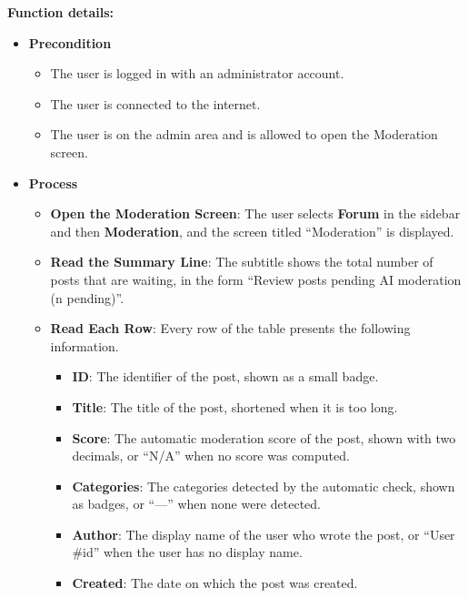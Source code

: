 \textbf{Function details:}
\begin{itemize}[leftmargin=1.6em,topsep=4pt,itemsep=3pt,parsep=0pt,label=$\bullet$]
    \item \textbf{Precondition}
        \begin{itemize}[leftmargin=2.2em,topsep=2pt,itemsep=3pt,parsep=0pt,label=$\circ$]
            \item The user is logged in with an administrator account.
            \item The user is connected to the internet.
            \item The user is on the admin area and is allowed to open the Moderation screen.
        \end{itemize}
    \item \textbf{Process}
        \begin{itemize}[leftmargin=2.2em,topsep=2pt,itemsep=3pt,parsep=0pt,label=$\circ$]
            \item \textbf{Open the Moderation Screen}: The user selects \textbf{Forum} in the sidebar and then \textbf{Moderation}, and the screen titled ``Moderation'' is displayed.
            \item \textbf{Read the Summary Line}: The subtitle shows the total number of posts that are waiting, in the form ``Review posts pending AI moderation (n pending)''.
            \item \textbf{Read Each Row}: Every row of the table presents the following information.
                \begin{itemize}[leftmargin=2.2em,topsep=2pt,itemsep=3pt,parsep=0pt,label=$\blacksquare$]
                    \item \textbf{ID}: The identifier of the post, shown as a small badge.
                    \item \textbf{Title}: The title of the post, shortened when it is too long.
                    \item \textbf{Score}: The automatic moderation score of the post, shown with two decimals, or ``N/A'' when no score was computed.
                    \item \textbf{Categories}: The categories detected by the automatic check, shown as badges, or ``---'' when none were detected.
                    \item \textbf{Author}: The display name of the user who wrote the post, or ``User \#id'' when the user has no display name.
                    \item \textbf{Created}: The date on which the post was created.

\end{itemize}
\end{itemize}
\end{itemize}
